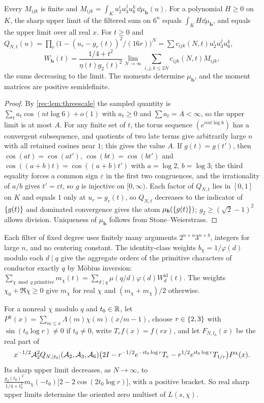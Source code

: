 \begin{theorem}\label{rec:thm:threescale}
Every $M_{ijk}$ is finite and $M_{ijk}=\int_Ku_2^iu_3^ju_6^k\,\dd\mu_{\boldsymbol b}(u)$. For a polynomial
$H\ge0$ on $K$, the sharp upper limit of the filtered sum on $6^n$ equals $\int_KH\dd\mu_{\boldsymbol b}$, and
equals the upper limit over all real $x$. For $t\ge0$ and
$Q_{N,t}(u)=\prod_r\bigl(1-(u_r-g_r(t))^2/(16r)\bigr)^N=\sum c_{ijk}(N,t)u_2^iu_3^ju_6^k$,
\[
 W_{\boldsymbol b}(t)=\frac{1/4+t^2}{\eta(t)g_2(t)^2}\lim_{N\to\infty}\sum_{i,j,k\le2N}c_{ijk}(N,t)M_{ijk},
\]
the sums decreasing to the limit. The moments determine $\mu_{\boldsymbol b}$, and the moment matrices
are positive semidefinite.
\end{theorem}

\begin{proof}
By \cref{rec:lem:threescale} the sampled quantity is $\sum_ta_t\cos(nt\log6)+o(1)$ with $a_t\ge0$ and
$\sum a_t=A<\infty$, so the upper limit is at most $A$. For any finite set of $t$, the torus sequence
$(e^{imt\log6})$ has a convergent subsequence, and quotients of two late terms give arbitrarily
large $n$ with all retained cosines near $1$; this gives the value $A$. If $g(t)=g(t')$, then
$\cos(at)=\cos(at')$, $\cos(bt)=\cos(bt')$ and $\cos((a+b)t)=\cos((a+b)t')$ with $a=\log2$, $b=\log3$;
the third equality forces a common sign $\varepsilon$ in the first two congruences, and the
irrationality of $a/b$ gives $t'=\varepsilon t$, so $g$ is injective on $[0,\infty)$. Each factor of
$Q_{N,t}$ lies in $[0,1]$ on $K$ and equals $1$ only at $u_r=g_r(t)$, so $Q_{N,t}$ decreases to the
indicator of $\{g(t)\}$ and dominated convergence gives the atom $\mu_{\boldsymbol b}(\{g(t)\})$;
$g_2\ge(\sqrt2-1)^2$ allows division. Uniqueness of $\mu_{\boldsymbol b}$ follows from
Stone--Weierstrass.
\end{proof}

Each filter of fixed degree uses finitely many arguments $2^{n+a}3^{n+b}$, integers for large $n$,
and no centering constant. The identity-class weights $b_\chi=1/\varphi(d)$ modulo each $d\mid q$ give
the aggregate orders of the primitive characters of conductor exactly $q$ by Möbius inversion:
$\sum_{\chi\bmod q\text{ primitive}}m_\chi(t)=\sum_{d\mid q}\mu(q/d)\varphi(d)W_d^{\mathrm{id}}(t)$. The
weights $\chi_0+\Re\chi\ge0$ give $m_\chi$ for real $\chi$ and $(m_\chi+m_{\bar\chi})/2$ otherwise.

\begin{proposition}\label{rec:prop:oriented}
For a nonreal $\chi$ modulo $q$ and $t_0\in\mathbb{R}$, let
$P^\chi(x)=\sum_{m\le x}\Lambda(m)\chi(m)(x/m-1)$, choose $r\in\{2,3\}$ with $\sin(t_0\log r)\ne0$ if
$t_0\ne0$, write $T_rf(x)=f(rx)$, and let $F_{N,t_0}(x)$ be the real part of
\[
 x^{-1/2}\mathcal{A}_2^2Q_{N,\lvert t_0\rvert}(\mathcal{A}_2,\mathcal{A}_3,\mathcal{A}_6)
 \bigl(2I-r^{-1/2}e^{-it_0\log r}T_r-r^{1/2}e^{it_0\log r}T_{1/r}\bigr)P^\chi(x).
\]
Its sharp upper limit decreases, as $N\to\infty$, to
$\frac{g_2(t_0)^2}{1/4+t_0^2}m_\chi(-t_0)\bigl[2-2\cos(2t_0\log r)\bigr]$, with a positive bracket. So
real sharp upper limits determine the oriented zero multiset of $L(s,\chi)$.
\end{proposition}

